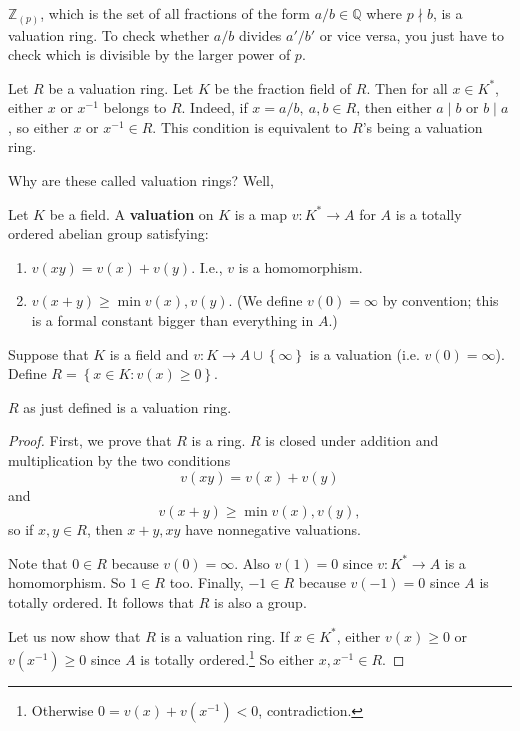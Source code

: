 \begin{example} 
$\mathbb{Z}_{(p)}$, which is the set of all fractions of the form $a/b \in
\mathbb{Q}$ where $p \nmid b$, is a valuation ring. To check whether $a/b$
divides $a'/b'$ or vice versa, you  just have to check which is divisible by
the larger power of $p$. 
\end{example} 

\begin{remark} Let $R$ be a valuation ring.
Let $K$ be the fraction field of $R$. Then for all $x \in K^*$, either $x$ or
$x^{-1}$ belongs to $R$. Indeed, if $x=a/b , \ a,b \in R$, then either $a \mid
b$ or $b \mid a$, so either $x$ or $x^{-1} \in R$. This condition is equivalent
to $R$'s being a valuation ring.
\end{remark} 

Why are these called valuation rings? Well, 
\begin{definition} 
Let $K$ be a field. A \textbf{valuation} on $K$ is a map $v: K^* \to A$ for $A$
is a totally ordered abelian group  satisfying:
\begin{enumerate}
\item $v(xy) = v(x) + v(y)$. I.e., $v$ is a homomorphism. 
\item $v(x+y) \geq \min v(x), v(y)$. (We define $v(0) = \infty$ by convention;
this is a formal constant bigger than everything in $A$.)
\end{enumerate}

\end{definition} 
Suppose that $K$ is a field and $v: K \to A \cup \left\{\infty\right\}$ is a
valuation (i.e. $v(0) = \infty$). Define $R = \left\{x \in K: v(x) \geq
0\right\}$.
\begin{proposition} 
$R$ as just defined is a valuation ring. 
\end{proposition} 
\begin{proof}  First, we prove that $R$ is a ring.
$R$ is closed under addition and multiplication by the two conditions 
\[ v(xy)  = v(x) + v(y)  \]
and
\[ v(x+y) \geq \min v(x), v(y) , \]
so if $x,y \in R$, then $x+y, xy$ have nonnegative valuations. 

Note that $0 \in R$ because $v(0) = \infty$. Also $v(1) = 0$ since $v: K^* \to A$
is a homomorphism. So $1 \in R$ too. 
Finally, $-1 \in R$ because $v(-1) =0$ since $A$ is totally ordered.  It
follows that $R$ is also a group. 

Let us now show that $R$ is a valuation ring. If $x \in K^*$, either $v(x) \geq
0$ or $v(x^{-1}) \geq 0$ since $A$ is totally ordered.\footnote{Otherwise $0
=v(x)+v(x^{-1}) < 0$, contradiction.} So either $x, x^{-1} \in R$.
\end{proof} 

